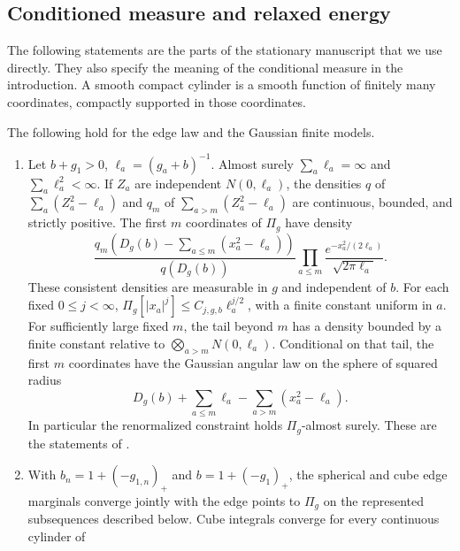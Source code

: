 \subsection{Conditioned measure and relaxed energy}

The following statements are the parts of the stationary manuscript
that we use directly. They also specify the meaning of the conditional
measure in the introduction. A smooth compact cylinder is a smooth
function of finitely many coordinates, compactly supported in those
coordinates.

\begin{proposition}\label{prop:stationary-inputs}
The following hold for the edge law and the Gaussian finite models.
\begin{enumerate}
\item Let \(b+g_1>0\), \(\ell_a=(g_a+b)^{-1}\). Almost surely
      \(\sum_a\ell_a=\infty\) and \(\sum_a\ell_a^2<\infty\).
      If \(Z_a\) are independent \(N(0,\ell_a)\), the densities \(q\)
      of \(\sum_a(Z_a^2-\ell_a)\) and \(q_m\) of
      \(\sum_{a>m}(Z_a^2-\ell_a)\) are continuous, bounded, and strictly
      positive. The first \(m\) coordinates of \(\Pi_g\) have density
      \begin{equation}\label{eq:edge-cylinder-density}
       \frac{q_m\!\left(D_g(b)-\sum_{a\le m}(x_a^2-\ell_a)\right)}
            {q(D_g(b))}
       \prod_{a\le m}
          \frac{e^{-x_a^2/(2\ell_a)}}{\sqrt{2\pi\ell_a}}.
      \end{equation}
      These consistent densities are measurable in \(g\) and
      independent of \(b\). For each fixed \(0\le j<\infty\),
      \(\Pi_g[|x_a|^j]\le C_{j,g,b}\ell_a^{j/2}\), with a finite
      constant uniform in \(a\).
      For sufficiently large fixed \(m\), the tail beyond \(m\)
      has a density bounded by a finite constant relative to
      \(\bigotimes_{a>m}N(0,\ell_a)\). Conditional on that tail, the
      first \(m\) coordinates have the Gaussian angular law on the
      sphere of squared radius
      \[
       D_g(b)+\sum_{a\le m}\ell_a-\sum_{a>m}(x_a^2-\ell_a).
      \]
      In particular the renormalized constraint holds \(\Pi_g\)-almost
      surely. These are the statements of
      \cite[Proposition~2.3]{FUA}.
\item With \(b_n=1+(-g_{1,n})_+\) and \(b=1+(-g_1)_+\), the spherical
      and cube edge marginals converge jointly with the edge points to
      \(\Pi_g\) on the represented subsequences described below.
      Cube integrals converge for every continuous cylinder of

\end{enumerate}
\end{proposition}
